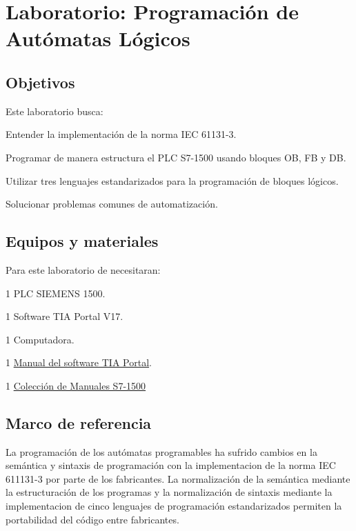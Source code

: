 \chapter{Laboratorio:  Programación de Autómatas Lógicos}


\section{Objetivos}
Este  laboratorio busca:
\begin{itemize}
	{\small
    \item Entender la implementación de la norma IEC 61131-3.
    \item Programar  de manera estructura el PLC S7-1500 usando bloques OB, FB y DB.
    \item Utilizar tres lenguajes estandarizados para la programación de bloques lógicos.
    \item Solucionar problemas comunes de automatización.
 }
\end{itemize} 

 
\section{Equipos y materiales}
Para este laboratorio de necesitaran:
\begin{itemize}
	{\small 
	\item 1 PLC SIEMENS 1500.
	\item 1 Software TIA Portal V17.
	\item 1 Computadora.
	\item 1 \href{https://support.industry.siemens.com/dl/files/056/109815056/att_1121729/v4/STEP_7_WinCC_V18_esES_es-ES.pdf}{Manual del software TIA Portal}.
	\item 1 \href{https://cache.industry.siemens.com/dl/files/384/86140384/att_1131259/v1/s71500_et200mp_manual_collection_es-ES.pdf}{Colección de Manuales S7-1500}
}
\end{itemize}

\section{Marco de referencia}

La programación de los autómatas programables ha sufrido cambios en la semántica y sintaxis de programación con la implementacion de la norma IEC 611131-3 \cite{IEC61131-1} por parte de los fabricantes. La normalización de la semántica  mediante la estructuración de los programas y la normalización de sintaxis mediante la implementacion de cinco lenguajes de programación estandarizados  permiten la portabilidad del código entre fabricantes. 

